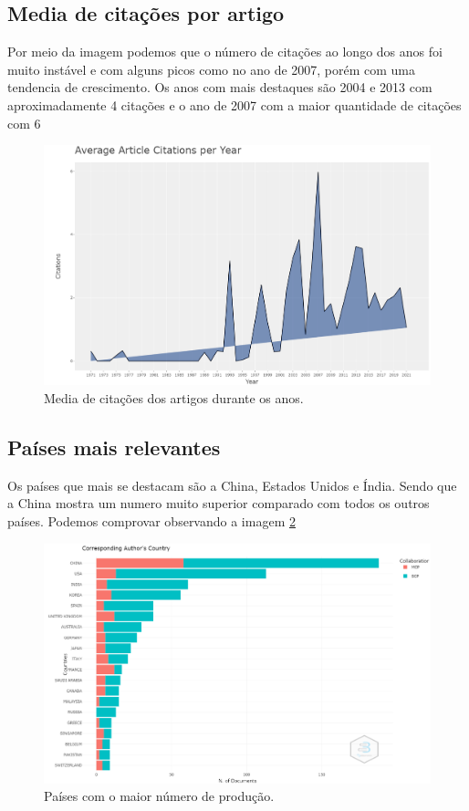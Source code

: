 \subsection{Media de citações por artigo}
Por meio da imagem podemos que o número de citações ao longo dos anos foi muito instável e com alguns picos como no ano de 2007, porém com uma tendencia de crescimento. Os anos com mais destaques são 2004 e 2013 com aproximadamente 4 citações e o ano de 2007 com a maior quantidade de citações com 6

\begin{figure}
    \centering
    \includegraphics[width=1\textwidth]{experiments/AllannH/PesquisaBibliometrica/Imagens/TSW-AllannH-media_citacoes.png}
    \caption{Media de citações dos artigos durante os anos.}
    \label{fig:AllannH-media_citacoes}
\end{figure}

\subsection{Países mais relevantes}

Os países que mais se destacam são a China, Estados Unidos e Índia. Sendo que a China mostra um numero muito superior comparado com todos os outros países. Podemos comprovar observando a imagem \ref{fig:AllannH-paises_relevantes}

\begin{figure}
    \centering
    \includegraphics[width=1\textwidth]{experiments/AllannH/PesquisaBibliometrica/Imagens/TSW-AllannH-paises_relevantes.png}
    \caption{Países com o maior número de produção.}
    \label{fig:AllannH-paises_relevantes}
\end{figure}

